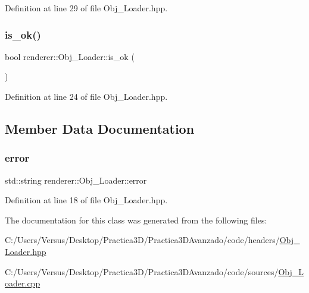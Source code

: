 Definition at line 29 of file Obj\+\_\+\+Loader.\+hpp.

\mbox{\label{classrenderer_1_1_obj___loader_a2d697790143483361863d720370f758b}} 
\subsubsection{\texorpdfstring{is\_ok()}{is\_ok()}}
{\footnotesize\ttfamily bool renderer\+::\+Obj\+\_\+\+Loader\+::is\+\_\+ok (\begin{DoxyParamCaption}{ }\end{DoxyParamCaption})\hspace{0.3cm}{\ttfamily [inline]}}



Definition at line 24 of file Obj\+\_\+\+Loader.\+hpp.



\subsection{Member Data Documentation}
\mbox{\label{classrenderer_1_1_obj___loader_a2852df3e4b485281d766b3420418c0e5}} 
\subsubsection{\texorpdfstring{error}{error}}
{\footnotesize\ttfamily std\+::string renderer\+::\+Obj\+\_\+\+Loader\+::error\hspace{0.3cm}{\ttfamily [private]}}



Definition at line 18 of file Obj\+\_\+\+Loader.\+hpp.



The documentation for this class was generated from the following files\+:\begin{DoxyCompactItemize}
\item 
C\+:/\+Users/\+Versus/\+Desktop/\+Practica3\+D/\+Practica3\+D\+Avanzado/code/headers/\mbox{\hyperlink{_obj___loader_8hpp}{Obj\+\_\+\+Loader.\+hpp}}\item 
C\+:/\+Users/\+Versus/\+Desktop/\+Practica3\+D/\+Practica3\+D\+Avanzado/code/sources/\mbox{\hyperlink{_obj___loader_8cpp}{Obj\+\_\+\+Loader.\+cpp}}\end{DoxyCompactItemize}
